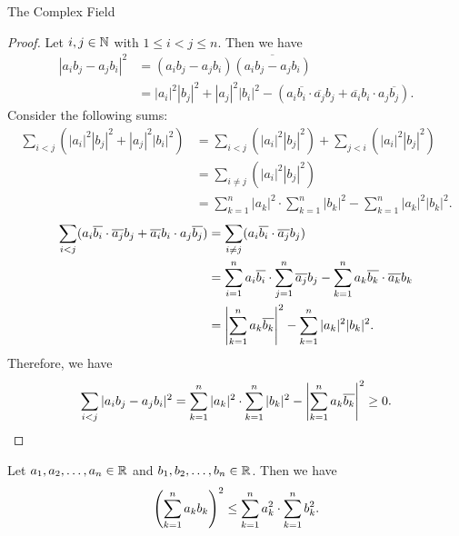 \begin{section}{The Complex Field}
\begin{proof}
    Let $i, j \in \N$ with $1 \leq i < j \leq n$. Then we have
    \begin{align*}
        |{a_{i} b_{j} - a_{j} b_{i}}|^{2} &= (a_{i} b_{j} - a_{j} b_{i}) \overline{(a_{i} b_{j} - a_{j} b_{i})} \\
        &= |a_{i}|^{2} |b_{j}|^{2} + |a_{j}|^{2} |b_{i}|^{2} - (a_{i} \overline{b_{i}}\cdot
        \overline{a_{j}} b_{j} + \overline{a_{i}} b_{i} \cdot a_{j} \overline{b_{j}}).
    \end{align*}
    Consider the following sums:
    \begin{align*}
        \sum_{i < j} (|a_{i}|^{2} |b_{j}|^{2} + |a_{j}|^{2} |b_{i}|^{2})
        &= \sum_{i < j} (|a_{i}|^{2} |b_{j}|^{2}) + \sum_{j < i} (|a_{i}|^{2} |b_{j}|^{2}) \\
        &= \sum_{i \neq j} (|a_{i}|^{2} |b_{j}|^{2}) \\
        &= \sum_{k = 1}^{n} |a_{k}|^{2}
        \cdot \sum_{k = 1}^{n} |b_{k}|^{2} - \sum_{k = 1}^{n} |a_{k}|^{2} |b_{k}|^{2}.
    \end{align*}
    \begin{align*}
        \sum_{i < j} (a_{i} \overline{b_{i}} \cdot \overline{a_{j}} b_{j}
        + \overline{a_{i}} b_{i} \cdot a_{j} \overline{b_{j}})
        &= \sum_{i \neq j} (a_{i} \overline{b_{i}} \cdot \overline{a_{j}} b_{j}) \\
        &= \sum_{i = 1}^{n} a_{i} \overline{b_{i}} \cdot \sum_{j = 1}^{n} \overline{a_{j}} b_{j}
        - \sum_{k = 1}^{n} a_{k} \overline{b_{k}} \cdot \overline{a_{k}} b_{k} \\
        &= \abs*{\sum_{k = 1}^{n} a_{k} \overline{b_{k}}}^{2} - \sum_{k = 1}^{n} |a_{k}|^{2} |b_{k}|^{2}.
    \end{align*}
    Therefore, we have
    \[
    \sum_{i < j} |{a_{i} b_{j} - a_{j} b_{i}}|^{2} = \sum_{k = 1}^{n} |a_{k}|^{2} \cdot
    \sum_{k = 1}^{n} |b_{k}|^{2} - \abs*{\sum_{k = 1}^{n} a_{k} \overline{b_{k}}}^{2} \geq 0.
    \]
\end{proof}

\begin{corollary} \label{cor:CauchySchwarzInequalityForRealNumbers}
    Let $a_{1}, a_{2}, \ldots, a_{n} \in \R$ and $b_{1}, b_{2}, \ldots, b_{n} \in \R$. Then we have
    \[
    \paren*{\sum_{k = 1}^{n} a_{k} b_{k}}^{2} \leq \sum_{k = 1}^{n} a_{k}^{2} \cdot \sum_{k = 1}^{n} b_{k}^{2}.
    \]
\end{corollary}

\bigskip


\end{section}
